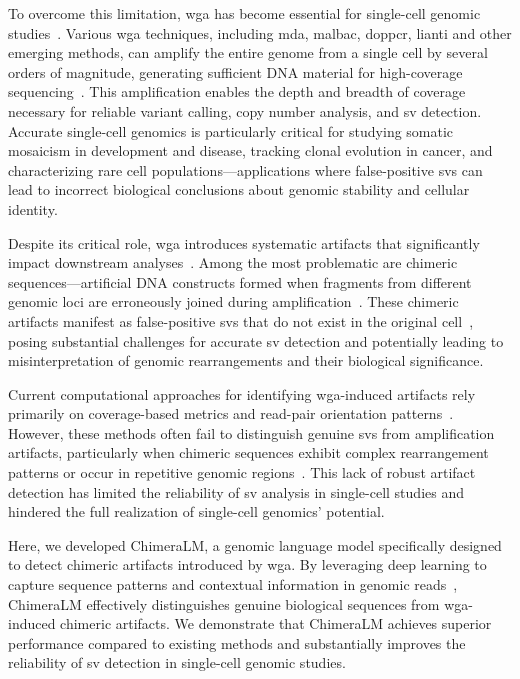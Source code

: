 \documentclass[pdflatex,sn-nature]{sn-jnl}%
\theoremstyle{thmstyleone}%
\theoremstyle{thmstyletwo}%
\theoremstyle{thmstylethree}%
\begin{document}
To overcome this limitation, \gls{wga} has become essential for single-cell genomic studies~\cite{zong2012genome, huang2015single, dean2002comprehensive}.
Various \gls{wga} techniques, including \gls{mda}, \gls{malbac}, \gls{doppcr}, \gls{lianti}  and other emerging methods, can amplify the entire genome from a single cell by several orders of magnitude, generating sufficient DNA material for high-coverage sequencing~\cite{de2014quantitative, biezuner2021comparison,fu2015uniform, agyabeng2025evaluating, telenius1992degenerate, leung2012programmable, chen2017singlecell}.
This amplification enables the depth and breadth of coverage necessary for reliable variant calling, copy number analysis, and \gls{sv} detection.
Accurate single-cell genomics is particularly critical for studying somatic mosaicism in development and disease, tracking clonal evolution in cancer, and characterizing rare cell populations---applications where false-positive \glspl{sv} can lead to incorrect biological conclusions about genomic stability and cellular identity.

Despite its critical role, \gls{wga} introduces systematic artifacts that significantly impact downstream analyses~\cite{lu2023chimera, lu2023exploration,pinard2006assessment}.
Among the most problematic are chimeric sequences—artificial DNA constructs formed when fragments from different genomic loci are erroneously joined during amplification~\cite{lu2023chimera, lu2023exploration, agyabeng2025evaluating}.
These chimeric artifacts manifest as false-positive \glspl{sv} that do not exist in the original cell~\cite{lu2023chimera}, posing substantial challenges for accurate \gls{sv} detection and potentially leading to misinterpretation of genomic rearrangements and their biological significance.

Current computational approaches for identifying \gls{wga}-induced artifacts rely primarily on coverage-based metrics and read-pair orientation patterns~\cite{kiguchi2021long, lu2023exploration}.
However, these methods often fail to distinguish genuine \glspl{sv} from amplification artifacts, particularly when chimeric sequences exhibit complex rearrangement patterns or occur in repetitive genomic regions~\cite{kosugi2019comprehensive, mahmoud2019structural}.
This lack of robust artifact detection has limited the reliability of \gls{sv} analysis in single-cell studies and hindered the full realization of single-cell genomics' potential.

Here, we developed ChimeraLM, a genomic language model specifically designed to detect chimeric artifacts introduced by \gls{wga}.
By leveraging deep learning to capture sequence patterns and contextual information in genomic reads~\cite{dalla2025nucleotide, zhou2023dnabert, nguyen2023hyenadna}, ChimeraLM effectively distinguishes genuine biological sequences from \gls{wga}-induced chimeric artifacts.
We demonstrate that ChimeraLM achieves superior performance compared to existing methods and substantially improves the reliability of \gls{sv} detection in single-cell genomic studies.
\end{document}
